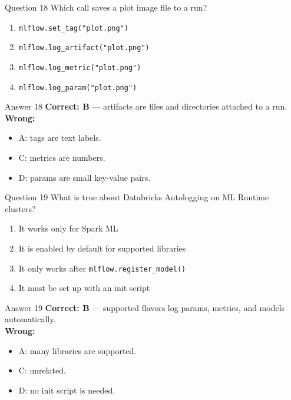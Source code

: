 \documentclass[aspectratio=169,11pt]{beamer}
\begin{document}
	\begin{frame}{Question 18}
		Which call saves a plot image file to a run?
		\begin{enumerate}[label=\Alph*.]
			\item \texttt{mlflow.set\_tag("plot.png")}
			\item \texttt{mlflow.log\_artifact("plot.png")}
			\item \texttt{mlflow.log\_metric("plot.png")}
			\item \texttt{mlflow.log\_param("plot.png")}
		\end{enumerate}
	\end{frame}
	\begin{frame}{Answer 18}
		\textbf{Correct: B} --- artifacts are files and directories attached to a run.\\
		\vspace{0.5em}
		\textbf{Wrong:}
		\begin{itemize}
			\item A: tags are text labels.
			\item C: metrics are numbers.
			\item D: params are small key-value pairs.
		\end{itemize}
	\end{frame}
	
	\begin{frame}{Question 19}
		What is true about Databricks Autologging on ML Runtime clusters?
		\begin{enumerate}[label=\Alph*.]
			\item It works only for Spark ML
			\item It is enabled by default for supported libraries
			\item It only works after \texttt{mlflow.register\_model()}
			\item It must be set up with an init script
		\end{enumerate}
	\end{frame}
	\begin{frame}{Answer 19}
		\textbf{Correct: B} --- supported flavors log params, metrics, and models automatically.\\
		\vspace{0.5em}
		\textbf{Wrong:}
		\begin{itemize}
			\item A: many libraries are supported.
			\item C: unrelated.
			\item D: no init script is needed.
		\end{itemize}
	\end{frame}
	
\end{document}
